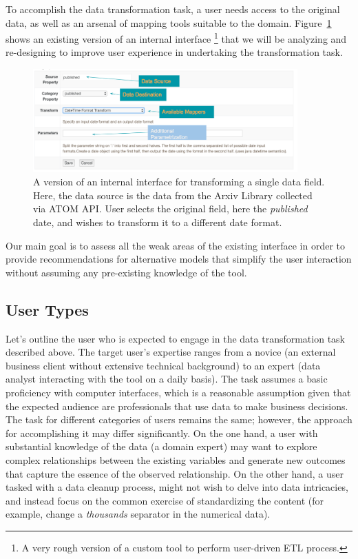 \documentclass[12pt,letterpaper]{article}
\begin{document}
To accomplish the data transformation task, a user needs access to the original data, as well as an arsenal of mapping tools suitable to the domain. Figure~\ref{fig::2} shows an existing version of an internal interface \footnote{A very rough version of a custom tool to perform user-driven ETL process.} that we will be analyzing and re-designing to improve user experience in undertaking the transformation task. 

\begin{figure}[H]
\centering
\includegraphics[width=4in, scale=.4]{NaraTransform.png}
\caption{A version of an internal interface for transforming a single data field. Here, the data source is the data from the Arxiv Library collected via ATOM API. User selects the original field, here the \textit{published} date, and wishes to transform it to a different date format.}
\label{fig::2}
\end{figure}

Our main goal is to assess all the weak areas of the existing interface in order to provide recommendations for alternative models that simplify the user interaction without assuming any pre-existing knowledge of the tool.

\subsection*{User Types}
Let's outline the user who is expected to engage in the data transformation task described above. The target user's expertise ranges from a novice (an external business client without extensive technical background) to an expert (data analyst interacting with the tool on a daily basis). The task assumes a basic proficiency with computer interfaces, which is a reasonable assumption given that the expected audience are professionals that use data to make business decisions. The task for different categories of users remains the same; however, the approach for accomplishing it may differ significantly. On the one hand, a user with substantial knowledge of the data (a domain expert) may want to explore complex relationships between the existing variables and generate new outcomes that capture the essence of the observed relationship. On the other hand, a user tasked with a data cleanup process, might not wish to delve into data intricacies, and instead focus on the common exercise of standardizing the content (for example, change a \textit{thousands} separator in the numerical data). 
\end{document}
